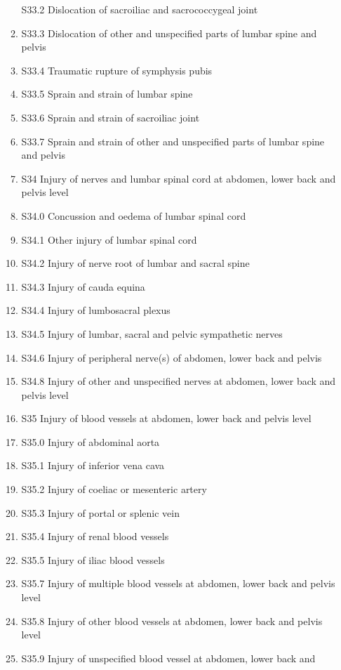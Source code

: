 \documentclass[
]{scrartcl}
\begin{document}
\begin{itemize}
\begin{enumerate}
    S33.2 Dislocation of sacroiliac and sacrococcygeal joint
  \item
    S33.3 Dislocation of other and unspecified parts of lumbar spine and
    pelvis
  \item
    S33.4 Traumatic rupture of symphysis pubis
  \item
    S33.5 Sprain and strain of lumbar spine
  \item
    S33.6 Sprain and strain of sacroiliac joint
  \item
    S33.7 Sprain and strain of other and unspecified parts of lumbar
    spine and pelvis
  \item
    S34 Injury of nerves and lumbar spinal cord at abdomen, lower back
    and pelvis level
  \item
    S34.0 Concussion and oedema of lumbar spinal cord
  \item
    S34.1 Other injury of lumbar spinal cord
  \item
    S34.2 Injury of nerve root of lumbar and sacral spine
  \item
    S34.3 Injury of cauda equina
  \item
    S34.4 Injury of lumbosacral plexus
  \item
    S34.5 Injury of lumbar, sacral and pelvic sympathetic nerves
  \item
    S34.6 Injury of peripheral nerve(s) of abdomen, lower back and
    pelvis
  \item
    S34.8 Injury of other and unspecified nerves at abdomen, lower back
    and pelvis level
  \item
    S35 Injury of blood vessels at abdomen, lower back and pelvis level
  \item
    S35.0 Injury of abdominal aorta
  \item
    S35.1 Injury of inferior vena cava
  \item
    S35.2 Injury of coeliac or mesenteric artery
  \item
    S35.3 Injury of portal or splenic vein
  \item
    S35.4 Injury of renal blood vessels
  \item
    S35.5 Injury of iliac blood vessels
  \item
    S35.7 Injury of multiple blood vessels at abdomen, lower back and
    pelvis level
  \item
    S35.8 Injury of other blood vessels at abdomen, lower back and
    pelvis level
  \item
    S35.9 Injury of unspecified blood vessel at abdomen, lower back and

\end{enumerate}
\end{itemize}
\end{document}
